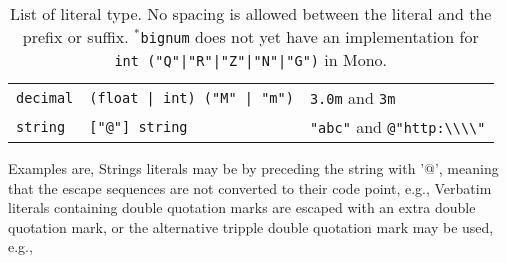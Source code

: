\begin{table}
\begin{tabular}{|l|l|l|}
    \lstinline!decimal! &\lstinline[language=ebnf]!(float | int) ("M" | "m")! & \lstinline!3.0m! and \lstinline!3m!  \\
    \lstinline!string! & \lstinline[language=ebnf]!["@"] string!  & \lstinline!"abc"! and \lstinline!@"http:\\\\"!  \\
    \hline
  \end{tabular}
  \caption{List of literal type. No spacing is allowed between the literal and the prefix or suffix. $^*$\lstinline[language=ebnf]!bignum! does not yet have an implementation for \lstinline[language=ebnf]!int ("Q"|"R"|"Z"|"N"|"G")! in Mono.}
  \label{tab:literalTypes}
\end{table}
Examples are,
%
Strings literals may be  by preceding the string with '@', meaning that the escape sequences are not converted to their code point, e.g., 
%
%
Verbatim literals containing double quotation marks are escaped with an extra double quotation mark, or the alternative tripple double quotation mark may be used, e.g.,
%
%


